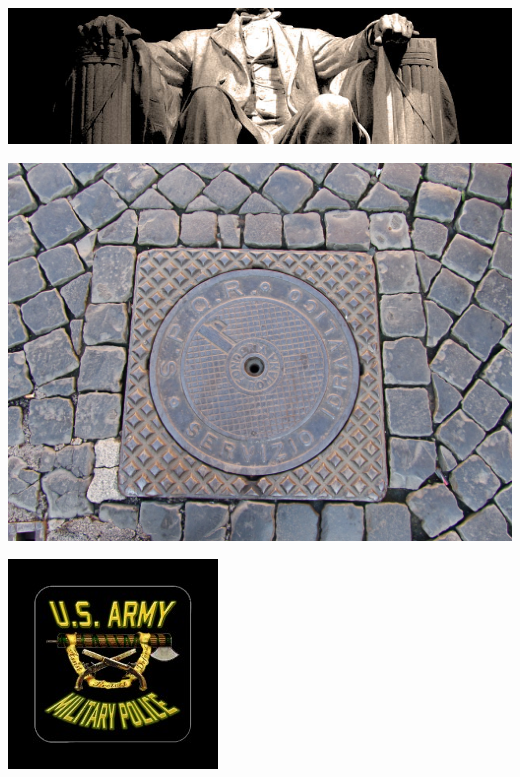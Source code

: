 \begin{frame}
    \centering
    \includegraphics[width=.9\textwidth]{img/fasces/lincoln_fasces.jpg} \\
\end{frame}
\begin{frame}
    \centering
    \includegraphics[width=.9\textwidth]{img/fasces/manhole.JPG} \\
\end{frame}
\begin{frame}
    \centering
    \includegraphics[height=.8\textheight]{img/fasces/mp.jpg} \\
\end{frame}
